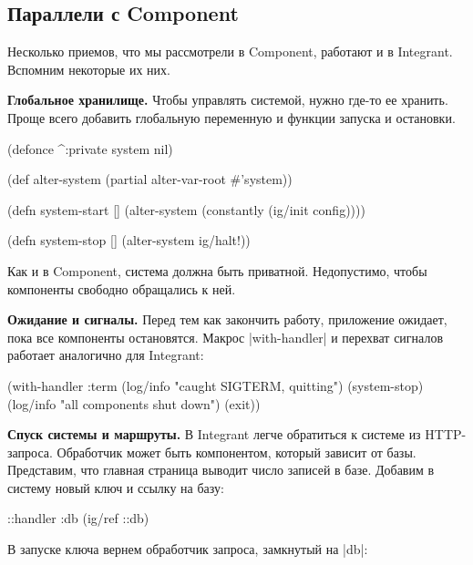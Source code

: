 \subsection{Параллели с Component}

Несколько приемов, что мы рассмотрели в Component, работают и в
Integrant. Вспомним некоторые их них.

\textbf{Глобальное хранилище.} Чтобы управлять системой, нужно где-то ее
хранить. Проще всего добавить глобальную переменную и функции запуска и
остановки.

\begin{english}
  \begin{clojure}
(defonce ^:private system nil)

(def alter-system (partial alter-var-root #'system))

(defn system-start []
  (alter-system (constantly (ig/init config))))

(defn system-stop []
  (alter-system ig/halt!))
  \end{clojure}
\end{english}

Как и в Component, система должна быть приватной. Недопустимо, чтобы
компоненты свободно обращались к ней.

\textbf{Ожидание и сигналы.} Перед тем как закончить работу, приложение ожидает,
пока все компоненты остановятся. Макрос \spverb|with-handler| и перехват
сигналов работает аналогично для Integrant:

\begin{english}
  \begin{clojure}
(with-handler :term
  (log/info "caught SIGTERM, quitting")
  (system-stop)
  (log/info "all components shut down")
  (exit))
  \end{clojure}
\end{english}

\textbf{Спуск системы и маршруты.} В Integrant легче обратиться к системе из
HTTP-запроса. Обработчик может быть компонентом, который зависит от
базы. Представим, что главная страница выводит число записей в базе. Добавим в
систему новый ключ и ссылку на базу:

\begin{english}
  \begin{clojure}
{::handler {:db (ig/ref ::db)}}
  \end{clojure}
\end{english}

В запуске ключа вернем обработчик запроса, замкнутый на \spverb|db|:

